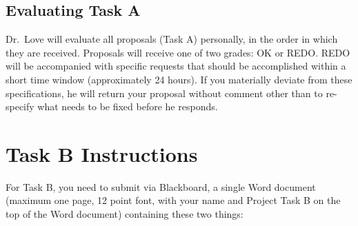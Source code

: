 \documentclass[]{book}
\theoremstyle{definition}
\theoremstyle{definition}
\theoremstyle{definition}
\theoremstyle{remark}
\begin{document}
\hypertarget{evaluating-task-a}{%
\section{Evaluating Task A}\label{evaluating-task-a}}

Dr.~Love will evaluate all proposals (Task A) personally, in the order
in which they are received. Proposals will receive one of two grades: OK
or REDO. REDO will be accompanied with specific requests that should be
accomplished within a short time window (approximately 24 hours). If you
materially deviate from these specifications, he will return your
proposal without comment other than to re-specify what needs to be fixed
before he responds.

\hypertarget{task-b-instructions}{%
\chapter{Task B Instructions}\label{task-b-instructions}}

For Task B, you need to submit via Blackboard, a single Word document
(maximum one page, 12 point font, with your name and Project Task B on
the top of the Word document) containing these two things:
\end{document}
